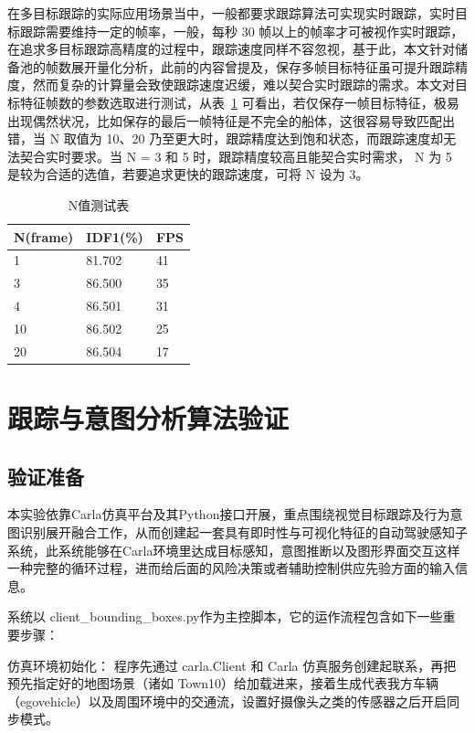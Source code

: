 在多目标跟踪的实际应用场景当中，一般都要求跟踪算法可实现实时跟踪，实时目标跟踪需要维持一定的帧率，一般，每秒 30 帧以上的帧率才可被视作实时跟踪，在追求多目标跟踪高精度的过程中，跟踪速度同样不容忽视，基于此，本文针对储备池的帧数展开量化分析，此前的内容曾提及，保存多帧目标特征虽可提升跟踪精度，然而复杂的计算量会致使跟踪速度迟缓，难以契合实时跟踪的需求。本文对目标特征帧数的参数选取进行测试，从表~\ref{tab:Ntest} 可看出，若仅保存一帧目标特征，极易出现偶然状况，比如保存的最后一帧特征是不完全的船体，这很容易导致匹配出错，当 N 取值为 10、20 乃至更大时，跟踪精度达到饱和状态，而跟踪速度却无法契合实时要求。当 N = 3 和 5 时，跟踪精度较高且能契合实时需求， N 为 5 是较为合适的选值，若要追求更快的跟踪速度，可将 N 设为 3。
\begin{table}[H]
	\caption{N值测试表}
	\label{tab:Ntest}
	\centering
	\begin{tabular}{lll}
		\toprule
		N(frame)  & IDF1(\%)  & FPS \\
		\midrule
		1 & 81.702 & 41 \\
		3 & 86.500 & 35 \\
		4 & 86.501 & 31 \\
		10 & 86.502 & 25 \\
		20 & 86.504 & 17 \\
		\bottomrule
	\end{tabular}
\end{table}

\section{跟踪与意图分析算法验证}

\subsection{验证准备}

本实验依靠Carla仿真平台及其Python接口开展，重点围绕视觉目标跟踪及行为意图识别展开融合工作，从而创建起一套具有即时性与可视化特征的自动驾驶感知子系统，此系统能够在Carla环境里达成目标感知，意图推断以及图形界面交互这样一种完整的循环过程，进而给后面的风险决策或者辅助控制供应先验方面的输入信息。

系统以 client\_bounding\_boxes.py作为主控脚本，它的运作流程包含如下一些重要步骤：

仿真环境初始化： 程序先通过 carla.Client 和 Carla 仿真服务创建起联系，再把预先指定好的地图场景（诸如 Town10）给加载进来，接着生成代表我方车辆（egovehicle）以及周围环境中的交通流，设置好摄像头之类的传感器之后开启同步模式。

